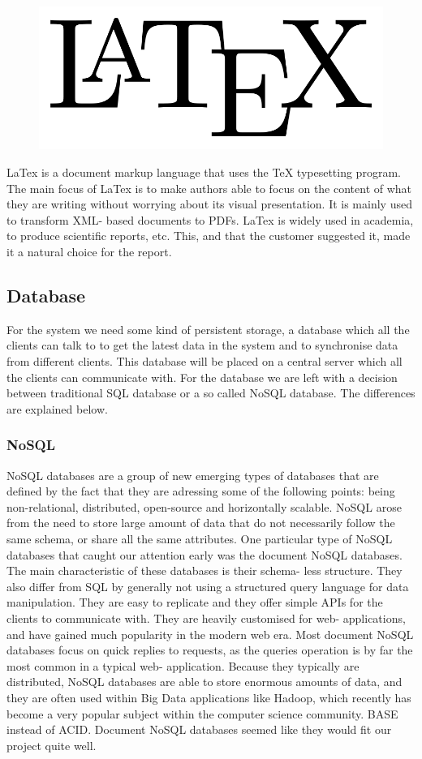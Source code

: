 \begin{figure}
\vspace{-30pt}
\centering
\includegraphics[width = .20\textwidth]{image/latex-logo.png}
\end{figure}

LaTex is a document markup language that uses the TeX typesetting program. The main focus of LaTex is to make authors able to focus on the content of what they are writing without worrying about its visual presentation. It is mainly used to transform XML- based documents to PDFs. LaTex is widely used in academia, to produce scientific reports, etc. This, and that the customer suggested it, made it a natural choice for the report. 

\subsection{Database}
For the system we need some kind of persistent storage, a database which all the clients can talk to to get the latest data in the system and to synchronise data from different clients. This database will be placed on a central server which all the clients can communicate with. For the database we are left with a decision between traditional SQL database or a so called NoSQL database. The differences are explained below.

\subsubsection*{NoSQL}
NoSQL databases are a group of new emerging types of databases that are defined by the fact that they are adressing some of the following points: being non-relational, distributed, open-source and horizontally scalable\cite{nosql}. NoSQL arose from the need to store large amount of data that do not necessarily follow the same schema, or share all the same attributes. One particular type of NoSQL databases that caught our attention early was the document NoSQL databases. The main characteristic of these databases is their schema- less structure. They also differ from SQL by generally not using a structured query language for data manipulation. They are easy to replicate and they offer simple APIs for the clients to communicate with. They are heavily customised for web- applications, and have gained much popularity in the modern web era. Most document NoSQL databases focus on quick replies to requests, as the queries operation is by far the most common in a typical web- application. Because they typically are distributed, NoSQL databases are able to store enormous amounts of data, and they are often used within Big Data\cite{bigdata} applications like Hadoop\cite{hadoop}, which recently has become a very popular subject within the computer science community. 
BASE \cite{pritchett} instead of ACID. 
Document NoSQL databases seemed like they would fit our project quite well.
\cite{nosql-databases, nosql-article}

